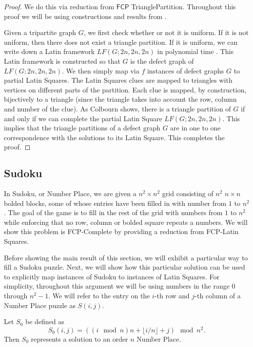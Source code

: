 \documentclass[runningheads,a4paper]{llncs}
\begin{document}
\begin{proof}
We do this via reduction from $\mathsf{FCP}$ TrianglePartition. Throughout this proof we will be using constructions and results from  \cite{colbourn1984complexity}.

Given a tripartite graph $G$, we first check whether or not it is uniform. If it is not uniform, then there does not exist a triangle partition. If it is uniform, we can write down a Latin framework $LF(G;2n,2n,2n)$ in polynomial time  \cite{colbourn1984complexity}. This Latin framework is constructed so that $G$ is the defect graph of $LF(G;2n,2n,2n)$. We then simply map via $f$ instances of defect graphs $G$ to partial Latin Squares. The Latin Squares clues are mapped to triangles with vertices on different parts of the partition. Each clue is mapped, by construction, bijectively to a triangle (since the triangle takes into account the row, column and number of the clue). As Colbourn shows, there is a triangle partition of $G$ if and only if we can complete the partial Latin Square $LF(G;2n,2n,2n)$. This implies that the triangle partitions of a defect graph $G$ are in one to one correspondence with the solutions to its Latin Square. This completes the proof. 

\end{proof}

\subsection{Sudoku}

In Sudoku, or Number Place, we are given a $n^2 \times n^2$ grid consisting of $n^2$ $n \times n$ bolded blocks, some of whose entries have been filled in with number from $1$ to $n^2$. The goal of the game is to fill in the rest of the grid with numbers from $1$ to $n^2$ while enforcing that no row, column or bolded square repeats a numbers. We will show this problem is FCP-Complete by providing a reduction from FCP-Latin Squares. 

Before showing the main result of this section, we will exhibit a particular way to fill a Sudoku puzzle. Next, we will show how this particular solution can be used to explicitly map instances of Sudoku to instances of Latin Squares. For simplicity, throughout this argument we will be using numbers in the range $0$ through $n^2 - 1$. We will refer to the entry on the $i$-th row and $j$-th column of a Number Place puzzle as $S(i,j)$.

\begin{proposition}
Let $S_0$ be defined as
$$S_0 (i,j) = ((i \mod n) n + \lfloor i/n \rfloor + j) \mod n^2. $$
Then $S_0$ represents a solution to an order $n$ Number Place.
\end{proposition}
\end{document}
